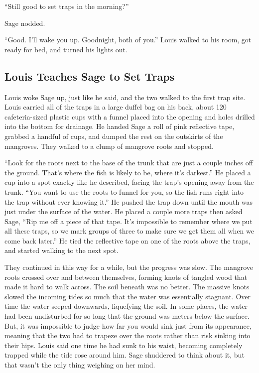 \documentclass[12pt, fleqn, AofM.tex]{subfiles}
\begin{document}
“Still good to set traps in the morning?”

Sage nodded.

“Good. I'll wake you up. Goodnight, both of you.” Louis walked to his room, got ready for bed, and turned his lights out. 

\subsection{Louis Teaches Sage to Set Traps}
Louis woke Sage up, just like he said, and the two walked to the first trap site. Louis carried all of the traps in a large duffel bag on his back, about 120 cafeteria-sized plastic cups with a funnel placed into the opening and holes drilled into the bottom for drainage. He handed Sage a roll of pink reflective tape, grabbed a handful of cups, and dumped the rest on the outskirts of the mangroves. They walked to a clump of mangrove roots and stopped.

“Look for the roots next to the base of the trunk that are just a couple inches off the ground. That's where the fish is likely to be, where it's darkest.” He placed a cup into a spot exactly like he described, facing the trap's opening away from the trunk. “You want to use the roots to funnel for you, so the fish runs right into the trap without ever knowing it.” He pushed the trap down until the mouth was just under the surface of the water. He placed a couple more traps then asked Sage, “Rip me off a piece of that tape. It's impossible to remember where we put all these traps, so we mark groups of three to make sure we get them all when we come back later.” He tied the reflective tape on one of the roots above the traps, and started walking to the next spot.

They continued in this way for a while, but the progress was slow. The mangrove roots crossed over and between themselves, forming knots of tangled wood that made it hard to walk across. The soil beneath was no better. The massive knots slowed the incoming tides so much that the water was essentially stagnant. Over time the water seeped downwards, liquefying the soil. In some places, the water had been undisturbed for so long that the ground was meters below the surface. But, it was impossible to judge how far you would sink just from its appearance, meaning that the two had to trapeze over the roots rather than risk sinking into their hips. Louis said one time he had sunk to his waist, becoming completely trapped while the tide rose around him. Sage shuddered to think about it, but that wasn't the only thing weighing on her mind.
\end{document}
